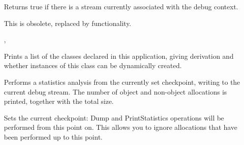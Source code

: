 \label{wxdebugcontexthasstream}


Returns true if there is a stream currently associated
with the debug context.

This is obsolete, replaced by  functionality.


, 

\label{wxdebugcontextprintclasses}


Prints a list of the classes declared in this application, giving derivation
and whether instances of this class can be dynamically created.



\label{wxdebugcontextprintstatistics}


Performs a statistics analysis from the currently set checkpoint, writing
to the current debug stream. The number of object and non-object
allocations is printed, together with the total size.





\label{wxdebugcontextsetcheckpoint}


Sets the current checkpoint: Dump and PrintStatistics operations will
be performed from this point on. This allows you to ignore allocations
that have been performed up to this point.



